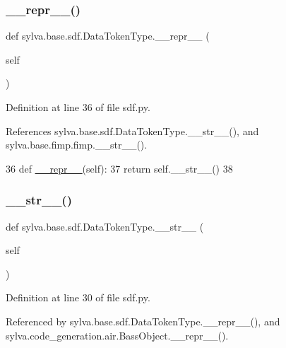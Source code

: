 \subsubsection{\texorpdfstring{\+\_\+\+\_\+repr\+\_\+\+\_\+()}{\_\_repr\_\_()}}
{\footnotesize\ttfamily def sylva.\+base.\+sdf.\+Data\+Token\+Type.\+\_\+\+\_\+repr\+\_\+\+\_\+ (\begin{DoxyParamCaption}\item[{}]{self }\end{DoxyParamCaption})}



Definition at line 36 of file sdf.\+py.



References sylva.\+base.\+sdf.\+Data\+Token\+Type.\+\_\+\+\_\+str\+\_\+\+\_\+(), and sylva.\+base.\+fimp.\+fimp.\+\_\+\+\_\+str\+\_\+\+\_\+().


\begin{DoxyCode}
36         \textcolor{keyword}{def }\hyperlink{namespacesylva_1_1code__generation_1_1floorplanner_a84f24b1e40f5425e9bb40ab45ccbd10f}{\_\_repr\_\_}(self):
37             \textcolor{keywordflow}{return} self.\_\_str\_\_()
38 
\end{DoxyCode}
\mbox{\label{classsylva_1_1base_1_1sdf_1_1_data_token_type_ab44771f0368f95e63030117f12b7e36d}} 
\subsubsection{\texorpdfstring{\+\_\+\+\_\+str\+\_\+\+\_\+()}{\_\_str\_\_()}}
{\footnotesize\ttfamily def sylva.\+base.\+sdf.\+Data\+Token\+Type.\+\_\+\+\_\+str\+\_\+\+\_\+ (\begin{DoxyParamCaption}\item[{}]{self }\end{DoxyParamCaption})}



Definition at line 30 of file sdf.\+py.



Referenced by sylva.\+base.\+sdf.\+Data\+Token\+Type.\+\_\+\+\_\+repr\+\_\+\+\_\+(), and sylva.\+code\+\_\+generation.\+air.\+Bass\+Object.\+\_\+\+\_\+repr\+\_\+\+\_\+().



